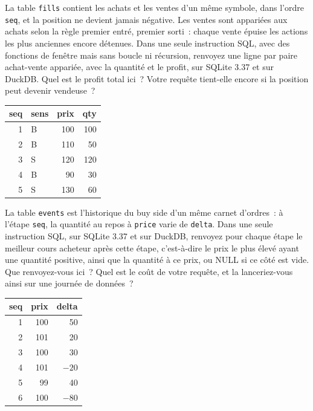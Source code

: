 \begin{question}\label{iq:iv3:sql-and-data:24}
La table \texttt{fills} contient les achats et les ventes d'un même symbole, dans l'ordre \texttt{seq}, et la position ne devient jamais négative. Les ventes sont appariées aux achats selon la règle premier entré, premier sorti~: chaque vente épuise les actions les plus anciennes encore détenues. Dans une seule instruction SQL, avec des fonctions de fenêtre mais sans boucle ni récursion, renvoyez une ligne par paire achat-vente appariée, avec la quantité et le profit, sur SQLite 3.37 et sur DuckDB. Quel est le profit total ici~? Votre requête tient-elle encore si la position peut devenir vendeuse~?
\begin{center}\small
\begin{tabular}{rlrr}
seq & sens & prix & qty\\\hline
1 & B & 100 & 100\\
2 & B & 110 & 50\\
3 & S & 120 & 120\\
4 & B & 90 & 30\\
5 & S & 130 & 60
\end{tabular}
\end{center}
\end{question}

\begin{question}\label{iq:iv3:sql-and-data:25}
La table \texttt{events} est l'historique du buy side d'un même carnet d'ordres~: à l'étape \texttt{seq}, la quantité au repos à \texttt{price} varie de \texttt{delta}. Dans une seule instruction SQL, sur SQLite 3.37 et sur DuckDB, renvoyez pour chaque étape le meilleur cours acheteur après cette étape, c'est-à-dire le prix le plus élevé ayant une quantité positive, ainsi que la quantité à ce prix, ou NULL si ce côté est vide. Que renvoyez-vous ici~? Quel est le coût de votre requête, et la lanceriez-vous ainsi sur une journée de données~?
\begin{center}\small
\begin{tabular}{rrr}
seq & prix & delta\\\hline
1 & 100 & 50\\
2 & 101 & 20\\
3 & 100 & 30\\
4 & 101 & $-20$\\
5 & 99 & 40\\
6 & 100 & $-80$
\end{tabular}
\end{center}
\end{question}

